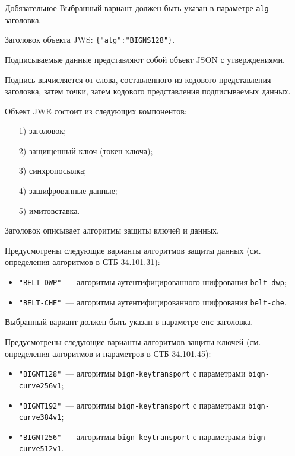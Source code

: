 \begin{appendix}{Д}{обязательное}{}
Выбранный вариант должен быть указан в параметре \lstinline{alg} заголовка.

\begin{example*}
Заголовок объекта JWS: \lstinline|{"alg":"BIGNS128"}|.
\end{example*}

Подписываемые данные представляют собой объект JSON с утверждениями. 

Подпись вычисляется от слова, составленного из кодового представления 
заголовка, затем точки, затем кодового представления подписываемых данных. 


Объект JWE состоит из следующих компонентов:
\begin{enumerate}
\item[1)] 
заголовок;
\item[2)] 
защищенный ключ (токен ключа);
\item[3)] 
синхропосылка;
\item[4)]
зашифрованные данные;
\item[5)]
имитовставка.
\end{enumerate}

Заголовок описывает алгоритмы защиты ключей и данных.

Предусмотрены следующие варианты алгоритмов защиты данных
(см. определения алгоритмов в СТБ 34.101.31):
\begin{itemize}
\item
\lstinline{"BELT-DWP"}~--- алгоритмы аутентифицированного шифрования 
\lstinline{belt-dwp}; 
\item
\lstinline{"BELT-CHE"}~--- алгоритмы аутентифицированного шифрования 
\lstinline{belt-che}.
\end{itemize}

Выбранный вариант должен быть указан в параметре \lstinline{enc} заголовка.

Предусмотрены следующие варианты алгоритмов защиты ключей
(см. определения алгоритмов и параметров в СТБ 34.101.45):
\begin{itemize}
\item
\lstinline{"BIGNT128"}~--- алгоритмы \lstinline{bign-keytransport} с 
параметрами \lstinline{bign-curve256v1};
\item
\lstinline{"BIGNT192"}~--- алгоритмы \lstinline{bign-keytransport} с 
параметрами \lstinline{bign-curve384v1};
\item
\lstinline{"BIGNT256"}~--- алгоритмы \lstinline{bign-keytransport} с 
параметрами \lstinline{bign-curve512v1}.
\end{itemize}


\end{appendix}
